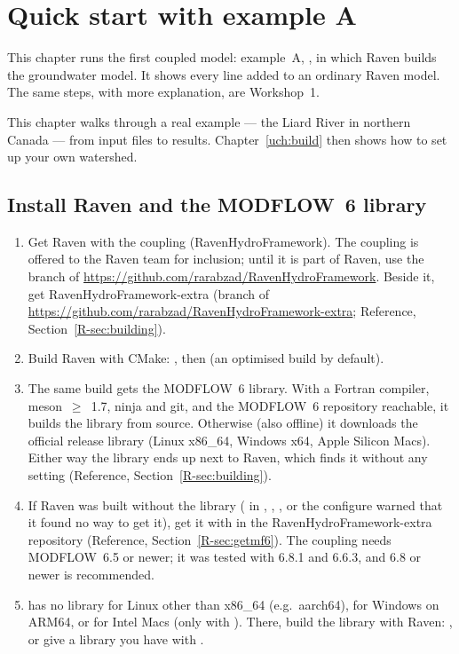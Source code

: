 \chapter{Quick start with example A}\label{uch:quick}\label{ch:c7}
This chapter runs the first coupled model: example~A, , in which Raven builds the
groundwater model. It shows every line added to an ordinary Raven model. The same steps, with more explanation, are
Workshop~1.

\begin{plain}
This chapter walks through a real example --- the Liard River in northern Canada --- from input files to results.
Chapter~\ref{uch:build} then shows how to set up your own watershed.
\end{plain}

\section{Install Raven and the MODFLOW~6 library}\label{sec:uinstall}
\begin{enumerate}
\item Get Raven with the coupling (RavenHydroFramework). The coupling is offered to the Raven team for inclusion; until it
is part of Raven, use the  branch of \url{https://github.com/rarabzad/RavenHydroFramework}. Beside it,
get RavenHydroFramework-extra (branch  of \url{https://github.com/rarabzad/RavenHydroFramework-extra};
Reference, Section~\ref{R-sec:building}).
\item Build Raven with CMake: , then  (an optimised
 build by default).
\item The same build gets the MODFLOW~6 library. With a Fortran compiler, meson~$\geq$~1.7, ninja and git, and the
MODFLOW~6 repository reachable, it builds the library from source. Otherwise (also offline) it downloads the official
release library (Linux x86\_64, Windows x64, Apple Silicon Macs). Either way the library ends up next to Raven, which
finds it without any setting (Reference, Section~\ref{R-sec:building}).
\item If Raven was built without the library ( in , , , or
the configure warned that it found no way to get it), get it with  in the
RavenHydroFramework-extra repository (Reference, Section~\ref{R-sec:getmf6}). The coupling needs MODFLOW~6.5 or newer; it
was tested with 6.8.1 and 6.6.3, and 6.8 or newer is recommended.
\item {} has no library for Linux other than x86\_64 (e.g.\ aarch64), for Windows on ARM64, or for Intel
Macs (only with ). There, build the library with Raven: ,
or give a library you have with .
\end{enumerate}
